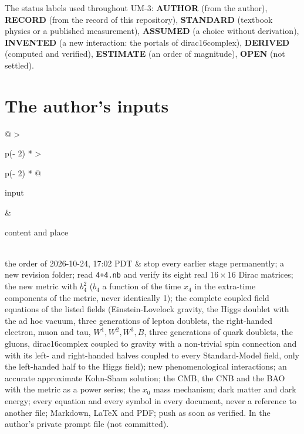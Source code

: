 \documentclass[
  10pt,
]{article}
\begin{document}
The status labels used throughout UM-3: \textbf{AUTHOR} (from the
author), \textbf{RECORD} (from the record of this repository),
\textbf{STANDARD} (textbook physics or a published measurement),
\textbf{ASSUMED} (a choice without derivation), \textbf{INVENTED} (a new
interaction: the portals of dirac16complex), \textbf{DERIVED} (computed
and verified), \textbf{ESTIMATE} (an order of magnitude), \textbf{OPEN}
(not settled).

\hypertarget{the-authors-inputs}{%
\section{The author's inputs}\label{the-authors-inputs}}

\begin{longtable}[]{@{}
  >{\raggedright\arraybackslash}p{(\columnwidth - 2\tabcolsep) * }
  >{\raggedright\arraybackslash}p{(\columnwidth - 2\tabcolsep) * }@{}}
\toprule\noalign{}
\begin{minipage}[b]{\linewidth}\raggedright
input
\end{minipage} & \begin{minipage}[b]{\linewidth}\raggedright
content and place
\end{minipage} \\
\midrule\noalign{}
\endhead
\bottomrule\noalign{}
\endlastfoot
the order of 2026-10-24, 17:02 PDT & stop every earlier stage
permanently; a new revision folder; read \texttt{4+4.nb} and verify its
eight real \(16 \times 16\) Dirac matrices; the new metric with
\(b_4^2\) (\(b_4\) a function of the time \(x_4\) in the extra-time
components of the metric, never identically 1); the complete coupled
field equations of the listed fields (Einstein-Lovelock gravity, the
Higgs doublet with the ad hoc vacuum, three generations of lepton
doublets, the right-handed electron, muon and tau, \(W^1, W^2, W^3, B\),
three generations of quark doublets, the gluons, dirac16complex coupled
to gravity with a non-trivial spin connection and with its left- and
right-handed halves coupled to every Standard-Model field, only the
left-handed half to the Higgs field); new phenomenological interactions;
an accurate approximate Kohn-Sham solution; the CMB, the CNB and the BAO
with the metric as a power series; the \(x_0\) mass mechanism; dark
matter and dark energy; every equation and every symbol in every
document, never a reference to another file; Markdown, LaTeX and PDF;
push as soon as verified. In the author's private prompt file (not
committed). \\

\end{longtable}
\end{document}
